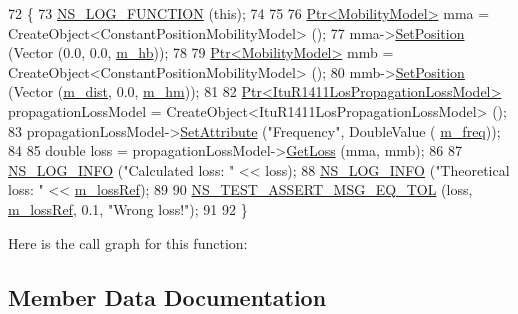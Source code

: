 \begin{DoxyCode}
72 \{
73   \hyperlink{log-macros-disabled_8h_a90b90d5bad1f39cb1b64923ea94c0761}{NS\_LOG\_FUNCTION} (\textcolor{keyword}{this});
74 
75 
76   \hyperlink{classns3_1_1Ptr}{Ptr<MobilityModel>} mma = CreateObject<ConstantPositionMobilityModel> ();
77   mma->\hyperlink{classns3_1_1MobilityModel_ac584b3d5a309709d2f13ed6ada1e7640}{SetPosition} (Vector (0.0, 0.0, \hyperlink{classItuR1411LosPropagationLossModelTestCase_ab75ce652202fc24192cb92d626c7f47b}{m\_hb}));
78 
79   \hyperlink{classns3_1_1Ptr}{Ptr<MobilityModel>} mmb = CreateObject<ConstantPositionMobilityModel> ();
80   mmb->\hyperlink{classns3_1_1MobilityModel_ac584b3d5a309709d2f13ed6ada1e7640}{SetPosition} (Vector (\hyperlink{classItuR1411LosPropagationLossModelTestCase_afe8c24a6ef9af2c655a55fc93fad143f}{m\_dist}, 0.0, \hyperlink{classItuR1411LosPropagationLossModelTestCase_acd72ea952850549a2be01556832a01e1}{m\_hm}));
81 
82   \hyperlink{classns3_1_1Ptr}{Ptr<ItuR1411LosPropagationLossModel>} propagationLossModel = 
      CreateObject<ItuR1411LosPropagationLossModel> ();
83   propagationLossModel->\hyperlink{classns3_1_1ObjectBase_ac60245d3ea4123bbc9b1d391f1f6592f}{SetAttribute} (\textcolor{stringliteral}{"Frequency"}, DoubleValue (
      \hyperlink{classItuR1411LosPropagationLossModelTestCase_a9eba28fb6f7cbaaee9fa445f610f0b89}{m\_freq}));
84 
85   \textcolor{keywordtype}{double} loss = propagationLossModel->\hyperlink{classns3_1_1ItuR1411LosPropagationLossModel_ad194a5751273291ef168cafa0efc9ca6}{GetLoss} (mma, mmb);
86 
87   \hyperlink{group__logging_gafbd73ee2cf9f26b319f49086d8e860fb}{NS\_LOG\_INFO} (\textcolor{stringliteral}{"Calculated loss: "} << loss);
88   \hyperlink{group__logging_gafbd73ee2cf9f26b319f49086d8e860fb}{NS\_LOG\_INFO} (\textcolor{stringliteral}{"Theoretical loss: "} << \hyperlink{classItuR1411LosPropagationLossModelTestCase_a30cbf5ac9194d5c16dace531cd87898b}{m\_lossRef});
89  
90   \hyperlink{group__testing_ga9e7861b56b4e70db3b56044cb7a28e41}{NS\_TEST\_ASSERT\_MSG\_EQ\_TOL} (loss, \hyperlink{classItuR1411LosPropagationLossModelTestCase_a30cbf5ac9194d5c16dace531cd87898b}{m\_lossRef}, 0.1, \textcolor{stringliteral}{"Wrong loss!"});
91 
92 \}
\end{DoxyCode}


Here is the call graph for this function\+:




\subsection{Member Data Documentation}
